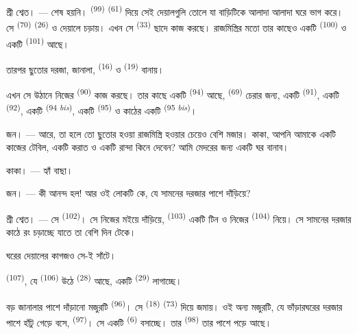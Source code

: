\textsc{শ্রী শ্বেত}। --- শেষ হয়নি। 
\textsuperscript{(99)}  \textsuperscript{(61)} দিয়ে সেই দেয়ালগুলি
তোলে যা বাড়িটিকে আলাদা আলাদা ঘরে ভাগ করে। সে 
\textsuperscript{(70)}  \textsuperscript{(26)} ও দেয়ালে চড়ায়।
এখন সে  \textsuperscript{(33)} ছাদে কাজ করছে। রাজমিস্ত্রির
মতো তার কাছেও একটি  \textsuperscript{(100)} ও একটি 
\textsuperscript{(101)} আছে।

তারপর ছুতোর দরজা, জানালা,  \textsuperscript{(16)} ও
 \textsuperscript{(19)} বানায়।

এখন সে উঠানে নিজের  \textsuperscript{(90)} কাজ করছে। তার
কাছে একটি  \textsuperscript{(94)} আছে, 
\textsuperscript{(69)} চেরার জন্য, একটি  \textsuperscript{(91)},
একটি  \textsuperscript{(92)}, একটি 
\textsuperscript{(94 \textit{bis})}, একটি  \textsuperscript{(95)} ও
কাঠের একটি  \textsuperscript{(95 \textit{bis})}।

\textsc{জন}। --- আরে, তা হলে তো ছুতোর হওয়া রাজমিস্ত্রি হওয়ার চেয়েও বেশি
মজার। কাকা, আপনি আমাকে একটি কাজের টেবিল, একটি করাত ও একটি রান্দা কিনে দেবেন?
আমি মেদরের জন্য একটি ঘর বানাব।

\textsc{কাকা}। --- হ্যাঁ বাছা।

\textsc{জন}। --- কী আনন্দ হল! আর ওই লোকটি কে, যে সামনের দরজার পাশে
দাঁড়িয়ে?

\VUsaut{3.0mm}
\VUsaut{3.0mm}

\textsc{শ্রী শ্বেত}। --- সে  \textsuperscript{(102)}। সে
নিজের মইয়ে দাঁড়িয়ে,  \textsuperscript{(103)} একটি টিন ও নিজের
 \textsuperscript{(104)} নিয়ে। সে সামনের দরজার কাঠে রং চড়াচ্ছে
যাতে তা বেশি দিন টেকে।

ঘরের দেয়ালের কাগজও সে-ই সাঁটে।

 \textsuperscript{(107)}, যে 
\textsuperscript{(106)} উঠে  \textsuperscript{(28)} আছে, একটি
 \textsuperscript{(29)} লাগাচ্ছে।

বড় জানালার পাশে দাঁড়ানো মজুরটি  \textsuperscript{(96)}।
সে  \textsuperscript{(18)}  \textsuperscript{(73)}
দিয়ে জমায়। ওই অন্য মজুরটি, যে ভাঁড়ারঘরের দরজার পাশে হাঁটু গেড়ে বসে,
 \textsuperscript{(97)}। সে একটি 
\textsuperscript{(6)} বসাচ্ছে। তার  \textsuperscript{(98)} তার পাশে
পড়ে আছে।

